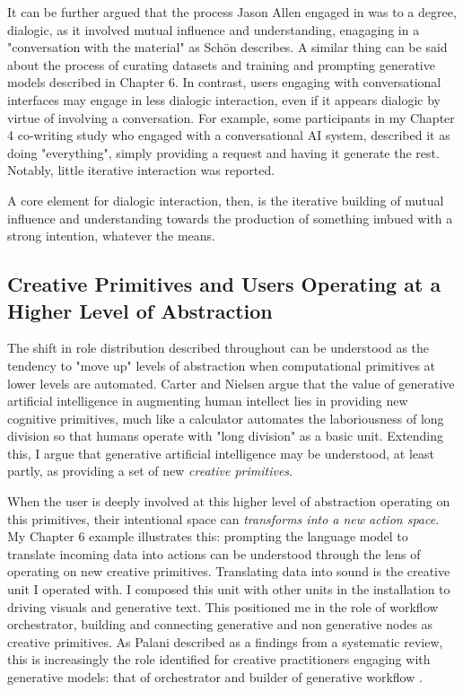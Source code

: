 It can be further argued that the process Jason Allen engaged in was to a degree, dialogic, as it involved mutual influence and understanding, enagaging in a "conversation with the material" as Schön describes. A similar thing can be said about the process of curating datasets and training and prompting generative models described in Chapter 6. In contrast, users engaging with conversational interfaces may engage in less dialogic interaction, even if it appears dialogic by virtue of involving a conversation. For example, some participants in my Chapter 4 co-writing study who engaged with a conversational AI system, described it as doing "everything", simply providing a request and having it generate the rest. Notably, little iterative interaction was reported. 

A core element for dialogic interaction, then, is the iterative building of mutual influence and understanding towards the production of something imbued with a strong intention, whatever the means. 

\subsection{Creative Primitives and Users Operating at a Higher Level of Abstraction}

The shift in role distribution described throughout can be understood as the tendency to "move up" levels of abstraction when computational primitives at lower levels are automated. Carter and Nielsen \cite{Carter2017-xj} argue that the value of generative artificial intelligence in augmenting human intellect lies in providing new cognitive primitives, much like a calculator automates the laboriousness of long division so that humans operate with "long division" as a basic unit. Extending this, I argue that generative artificial intelligence may be understood, at least partly, as providing a set of new \textit{creative primitives}.

When the user is deeply involved at this higher level of abstraction operating on this primitives, their intentional space can \textit{transforms into a new action space}. My Chapter 6 example illustrates this: prompting the language model to translate incoming data into actions can be understood through the lens of operating on new creative primitives. Translating data into sound is the creative unit I operated with. I composed this unit with other units in the installation to driving visuals and generative text. This positioned me in the role of workflow orchestrator, building and connecting generative and non generative nodes as creative primitives. As Palani described as a findings from a systematic review, this is increasingly the role identified for creative practitioners engaging with generative models: that of orchestrator and builder of generative workflow \cite{Palani2024-on}. 

